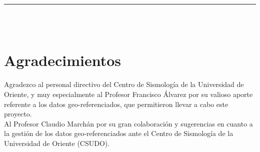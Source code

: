 \documentclass[12pt]{report}
\begin{document}
		
		\vskip 0.5cm \rule{\linewidth}{1.3pt}\\[0.5cm]         
		
		
		\thispagestyle{empty}~~\vspace{-0.2cm}
		
		
	
		\newpage
		
		
		
		
		
		\setcounter{page}{1}
		\pagestyle{plain}
		
		
		
		
		
		\chapter*{Agradecimientos} 
		
	
	Agradezco al personal directivo del  Centro de Sismología de la Universidad de Oriente, y muy especialmente al Profesor  Francisco Álvarez por su valioso aporte referente a los datos geo-referenciados,  que  permitieron  llevar a cabo este proyecto. \\


	
	Al Profesor Claudio Marchán por su gran colaboración y sugerencias  en cuanto a la gestión de los datos geo-referenciados ante el  Centro de Sismología de la Universidad de Oriente (CSUDO). 
	
	   
	
		
		
		
		
		
		
		\thispagestyle{empty}~~\vspace{-0.2cm}
	
\end{document}

